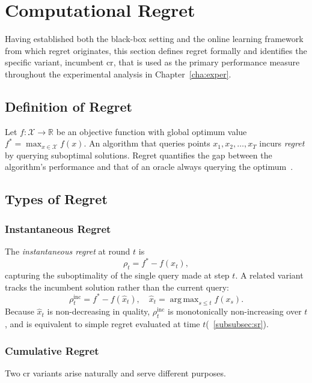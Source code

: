 \section{Computational Regret}
\label{sec:regret}
Having established both the black-box setting and the online
learning framework from which regret originates, this section
defines regret formally and identifies the specific variant,
incumbent \acrfull{cr}, that is used as the primary
performance measure throughout the experimental analysis in
Chapter~\ref{cha:exper}.

\subsection{Definition of Regret}
Let $f : \mathcal{X} \to \mathbb{R}$ be an objective function with
global optimum value
\\$f^{*} = \max_{x \in \mathcal{X}} f(x)$. An algorithm that queries points
$x_1, x_2, \ldots, x_T$ incurs \textit{regret} by querying suboptimal
solutions. Regret
quantifies the gap between the algorithm's performance and that of an
oracle always
querying the optimum~\cite{cesa2006prediction}.

\subsection{Types of Regret}

\subsubsection{Instantaneous Regret}
The \textit{instantaneous regret} at round $t$ is
\[
  \rho_t = f^{*} - f(x_t),
\]
capturing the suboptimality of the single query made at step $t$.
A related variant tracks the \gls{incumbent} solution rather than
the current query:
\[
  \rho^{\mathrm{inc}}_t = f^{*} - f(\hat{x}_t),
  \quad \hat{x}_t = \operatorname{arg\,max}_{s \leq t} f(x_s).
\]
Because $\hat{x}_t$ is non-decreasing in quality, $\rho^{\mathrm{inc}}_t$ is
monotonically non-increasing over $t$, and is equivalent to simple
regret evaluated at time $t$(~\ref{subsubsec:sr}).

\subsubsection{Cumulative Regret}
\label{subsubsec:cr}
Two \acrfull{cr} variants arise naturally and serve different purposes.

